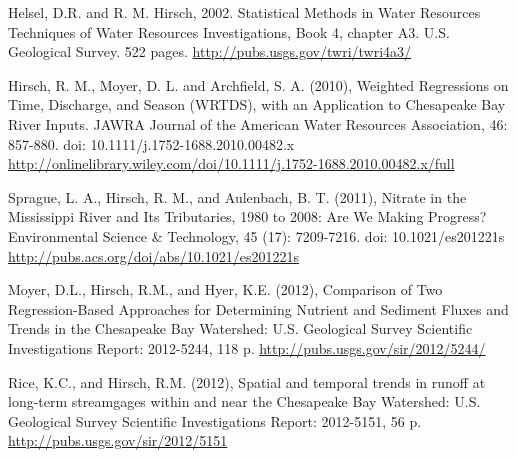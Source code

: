 \documentclass[a4paper,11pt]{article}\usepackage[]{graphicx}\usepackage[]{color}
\begin{document}
\clearpage
\begin{thebibliography}{10}

Helsel, D.R. and R. M. Hirsch, 2002. Statistical Methods in Water Resources Techniques of Water Resources Investigations, Book 4, chapter A3. U.S. Geological Survey. 522 pages. \url{http://pubs.usgs.gov/twri/twri4a3/}

Hirsch, R. M., Moyer, D. L. and Archfield, S. A. (2010), Weighted Regressions on Time, Discharge, and Season (WRTDS), with an Application to Chesapeake Bay River Inputs. JAWRA Journal of the American Water Resources Association, 46: 857-880. doi: 10.1111/j.1752-1688.2010.00482.x \url{http://onlinelibrary.wiley.com/doi/10.1111/j.1752-1688.2010.00482.x/full}

Sprague, L. A., Hirsch, R. M., and Aulenbach, B. T. (2011), Nitrate in the Mississippi River and Its Tributaries, 1980 to 2008: Are We Making Progress? Environmental Science \& Technology, 45 (17): 7209-7216. doi: 10.1021/es201221s \url{http://pubs.acs.org/doi/abs/10.1021/es201221s}

Moyer, D.L., Hirsch, R.M., and Hyer, K.E. (2012), Comparison of Two Regression-Based Approaches for Determining Nutrient and Sediment Fluxes and Trends in the Chesapeake Bay Watershed: U.S. Geological Survey Scientific Investigations Report: 2012-5244, 118 p. \url{http://pubs.usgs.gov/sir/2012/5244/}

Rice, K.C., and Hirsch, R.M. (2012), Spatial and temporal trends in runoff at long-term streamgages within and near the Chesapeake Bay Watershed: U.S. Geological Survey Scientific Investigations Report: 2012-5151, 56 p. \url{http://pubs.usgs.gov/sir/2012/5151}


\end{thebibliography}
\end{document}
